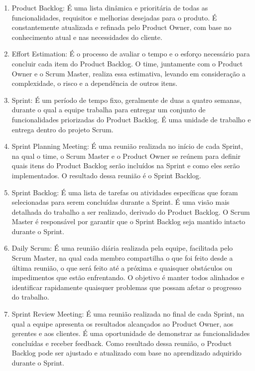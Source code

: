 \begin{enumerate}
	\item Product Backlog: É uma lista dinâmica e prioritária de todas as funcionalidades, requisitos e melhorias desejadas para o produto. É constantemente atualizada e refinada pelo Product Owner, com base no conhecimento atual e nas necessidades do cliente.
	\item Effort Estimation: É o processo de avaliar o tempo e o esforço necessário para concluir cada item do Product Backlog. O time, juntamente com o Product Owner e o Scrum Master, realiza essa estimativa, levando em consideração a complexidade, o risco e a dependência de outros itens.
	\item Sprint: É um período de tempo fixo, geralmente de duas a quatro semanas, durante o qual a equipe trabalha para entregar um conjunto de funcionalidades priorizadas do Product Backlog. É uma unidade de trabalho e entrega dentro do projeto Scrum.
	\item Sprint Planning Meeting: É uma reunião realizada no início de cada Sprint, na qual o time, o Scrum Master e o Product Owner se reúnem para definir quais itens do Product Backlog serão incluídos na Sprint e como eles serão implementados. O resultado dessa reunião é o Sprint Backlog.
	\item Sprint Backlog: É uma lista de tarefas ou atividades específicas que foram selecionadas para serem concluídas durante a Sprint. É uma visão mais detalhada do trabalho a ser realizado, derivado do Product Backlog. O Scrum Master é responsável por garantir que o Sprint Backlog seja mantido intacto durante o Sprint.
	\item Daily Scrum: É uma reunião diária realizada pela equipe, facilitada pelo Scrum Master, na qual cada membro compartilha o que foi feito desde a última reunião, o que será feito até a próxima e quaisquer obstáculos ou impedimentos que estão enfrentando. O objetivo é manter todos alinhados e identificar rapidamente quaisquer problemas que possam afetar o progresso do trabalho.
	\item Sprint Review Meeting: É uma reunião realizada no final de cada Sprint, na qual a equipe apresenta os resultados alcançados ao Product Owner, aos gerentes e aos clientes. É uma oportunidade de demonstrar as funcionalidades concluídas e receber feedback. Como resultado dessa reunião, o Product Backlog pode ser ajustado e atualizado com base no aprendizado adquirido durante o Sprint.
\end{enumerate}

